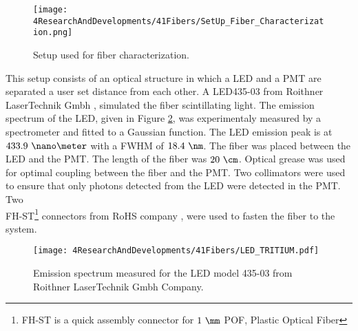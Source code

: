 \begin{figure}[h]
\centering
\texttt{[image: 4ResearchAndDevelopments/41Fibers/SetUp\_Fiber\_Characterization.png]}
\caption{Setup used for fiber characterization.\label{fig:SetUpFiberCharacterization}}
\end{figure}

This setup consists of an optical structure in which a LED and a PMT are separated a user set distance from each other. A LED435-03 from Roithner LaserTechnik Gmbh \cite{LEDRLT}, simulated the fiber scintillating light. The emission spectrum of the LED, given in Figure \ref{fig:LEDSpectrumTritium}, was experimentaly measured by a spectrometer and fitted to a Gaussian function. The LED emission peak is at $433.9~\nano\meter$ with a FWHM of $18.4~\nm$. The fiber was placed between the LED and the PMT. The length of the fiber was $20~\cm$. Optical grease \cite{OpticalGrease} was used for optimal coupling between the fiber and the PMT. Two collimators were used to ensure that only photons detected from the LED were detected in the PMT. Two \\FH-ST\footnote{FH-ST is a quick assembly connector for $1~\mm$ POF, Plastic Optical Fiber} connectors from RoHS company \cite{}, were used to fasten the fiber to the system. 

\begin{figure}[h]
\centering
\texttt{[image: 4ResearchAndDevelopments/41Fibers/LED\_TRITIUM.pdf]}
\caption{Emission spectrum measured for the LED model 435-03 from Roithner LaserTechnik Gmbh Company.\label{fig:LEDSpectrumTritium}}
\end{figure}